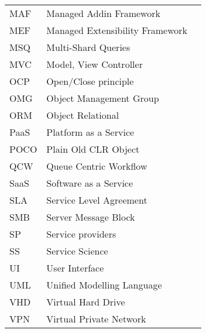 \begin{table}[h]
\begin{tabularx}{\textwidth}{l X l}
MAF         & Managed Addin Framework                                                                               &  \\
MEF         & Managed Extensibility Framework &  \\
MSQ         & Multi-Shard Queries                                                                                   &  \\
MVC         & Model, View Controller                                                                                &  \\
OCP         & Open/Close principle                                                                                  &  \\
OMG         & Object Management Group                                                                               &  \\
ORM         & Object Relational  &  \\
PaaS        & Platform as a Service                                                                                 &  \\
POCO        & Plain Old CLR Object                                                                                  &  \\
QCW         & Queue Centric Workflow                                                                                &  \\
SaaS        & Software as a Service                                                                                 &  \\
SLA         & Service Level Agreement                                                                               &  \\
SMB         & Server Message Block                                                                                  &  \\
SP          & Service providers                                                                                     &  \\
SS          & Service Science                                                                                       &  \\
UI          & User Interface                                                                                        &  \\
UML         & Unified Modelling Language  &  \\
VHD         & Virtual Hard Drive                                                                                    &  \\
VPN         & Virtual Private Network                                                                               & \\
\end{tabularx}
\end{table}